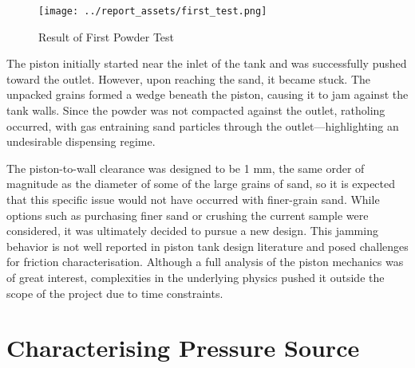 \begin{figure}[htbp]
    \centering
    
    \begin{minipage}{0.6\textwidth}
        \centering
        \texttt{[image: ../report\_assets/first\_test.png]}
        \caption{Result of First Powder Test}\label{fig:first-test}
    \end{minipage}
    
\end{figure}
The piston initially started near the inlet of the tank and was successfully pushed toward the outlet. However, upon reaching the sand, it became stuck. The unpacked grains formed a wedge beneath the piston, causing it to jam against the tank walls. Since the powder was not compacted against the outlet, ratholing occurred, with gas entraining sand particles through the outlet—highlighting an undesirable dispensing regime.

The piston-to-wall clearance was designed to be 1 mm, the same order of magnitude as the diameter of some of the large grains of sand, so it is expected that this specific issue would not have occurred with finer-grain sand. While options such as purchasing finer sand or crushing the current sample were considered, it was ultimately decided to pursue a new design. This jamming behavior is not well reported in piston tank design literature and posed challenges for friction characterisation. Although a full analysis of the piston mechanics was of great interest, complexities in the underlying physics pushed it outside the scope of the project due to time constraints.

\section{Characterising Pressure Source}\label{sec:static_test}
